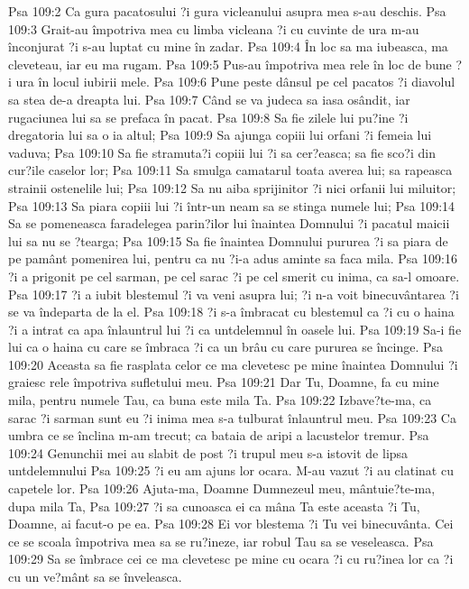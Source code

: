 Psa 109:2  Ca gura pacatosului ?i gura vicleanului asupra mea s-au deschis.
Psa 109:3  Grait-au împotriva mea cu limba vicleana ?i cu cuvinte de ura m-au înconjurat ?i s-au luptat cu mine în zadar.
Psa 109:4  În loc sa ma iubeasca, ma cleveteau, iar eu ma rugam.
Psa 109:5  Pus-au împotriva mea rele în loc de bune ?i ura în locul iubirii mele.
Psa 109:6  Pune peste dânsul pe cel pacatos ?i diavolul sa stea de-a dreapta lui.
Psa 109:7  Când se va judeca sa iasa osândit, iar rugaciunea lui sa se prefaca în pacat.
Psa 109:8  Sa fie zilele lui pu?ine ?i dregatoria lui sa o ia altul;
Psa 109:9  Sa ajunga copiii lui orfani ?i femeia lui vaduva;
Psa 109:10  Sa fie stramuta?i copiii lui ?i sa cer?easca; sa fie sco?i din cur?ile caselor lor;
Psa 109:11  Sa smulga camatarul toata averea lui; sa rapeasca strainii ostenelile lui;
Psa 109:12  Sa nu aiba sprijinitor ?i nici orfanii lui miluitor;
Psa 109:13  Sa piara copiii lui ?i într-un neam sa se stinga numele lui;
Psa 109:14  Sa se pomeneasca faradelegea parin?ilor lui înaintea Domnului ?i pacatul maicii lui sa nu se ?tearga;
Psa 109:15  Sa fie înaintea Domnului pururea ?i sa piara de pe pamânt pomenirea lui, pentru ca nu ?i-a adus aminte sa faca mila.
Psa 109:16  ?i a prigonit pe cel sarman, pe cel sarac ?i pe cel smerit cu inima, ca sa-l omoare.
Psa 109:17  ?i a iubit blestemul ?i va veni asupra lui; ?i n-a voit binecuvântarea ?i se va îndeparta de la el.
Psa 109:18  ?i s-a îmbracat cu blestemul ca ?i cu o haina ?i a intrat ca apa înlauntrul lui ?i ca untdelemnul în oasele lui.
Psa 109:19  Sa-i fie lui ca o haina cu care se îmbraca ?i ca un brâu cu care pururea se încinge.
Psa 109:20  Aceasta sa fie rasplata celor ce ma clevetesc pe mine înaintea Domnului ?i graiesc rele împotriva sufletului meu.
Psa 109:21  Dar Tu, Doamne, fa cu mine mila, pentru numele Tau, ca buna este mila Ta.
Psa 109:22  Izbave?te-ma, ca sarac ?i sarman sunt eu ?i inima mea s-a tulburat înlauntrul meu.
Psa 109:23  Ca umbra ce se înclina m-am trecut; ca bataia de aripi a lacustelor tremur.
Psa 109:24  Genunchii mei au slabit de post ?i trupul meu s-a istovit de lipsa untdelemnului
Psa 109:25  ?i eu am ajuns lor ocara. M-au vazut ?i au clatinat cu capetele lor.
Psa 109:26  Ajuta-ma, Doamne Dumnezeul meu, mântuie?te-ma, dupa mila Ta,
Psa 109:27  ?i sa cunoasca ei ca mâna Ta este aceasta ?i Tu, Doamne, ai facut-o pe ea.
Psa 109:28  Ei vor blestema ?i Tu vei binecuvânta. Cei ce se scoala împotriva mea sa se ru?ineze, iar robul Tau sa se veseleasca.
Psa 109:29  Sa se îmbrace cei ce ma clevetesc pe mine cu ocara ?i cu ru?inea lor ca ?i cu un ve?mânt sa se înveleasca.
